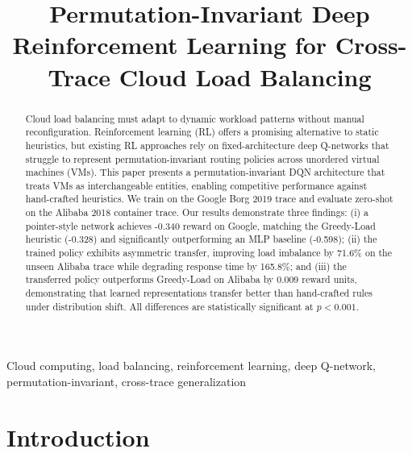 \documentclass[conference]{IEEEtran}
\begin{document}
\title{Permutation-Invariant Deep Reinforcement Learning for Cross-Trace Cloud Load Balancing}

\author{
\and
{}
}

\maketitle

\begin{abstract}
Cloud load balancing must adapt to dynamic workload patterns without manual reconfiguration. Reinforcement learning (RL) offers a promising alternative to static heuristics, but existing RL approaches rely on fixed-architecture deep Q-networks that struggle to represent permutation-invariant routing policies across unordered virtual machines (VMs). This paper presents a permutation-invariant DQN architecture that treats VMs as interchangeable entities, enabling competitive performance against hand-crafted heuristics. We train on the Google Borg 2019 trace and evaluate zero-shot on the Alibaba 2018 container trace. Our results demonstrate three findings: (i) a pointer-style network achieves -0.340 reward on Google, matching the Greedy-Load heuristic (-0.328) and significantly outperforming an MLP baseline (-0.598); (ii) the trained policy exhibits asymmetric transfer, improving load imbalance by 71.6\% on the unseen Alibaba trace while degrading response time by 165.8\%; and (iii) the transferred policy outperforms Greedy-Load on Alibaba by 0.009 reward units, demonstrating that learned representations transfer better than hand-crafted rules under distribution shift. All differences are statistically significant at $p < 0.001$.
\end{abstract}

\begin{IEEEkeywords}
Cloud computing, load balancing, reinforcement learning, deep Q-network, permutation-invariant, cross-trace generalization
\end{IEEEkeywords}

\section{Introduction}
\end{document}
